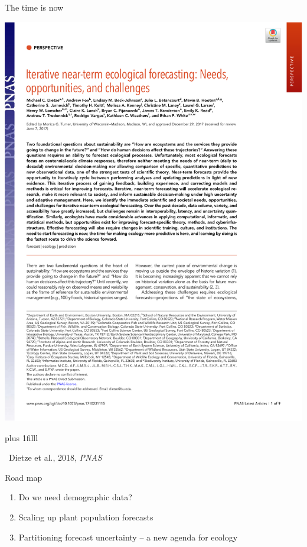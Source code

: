 \documentclass[14pt, compress, aspectratio=1610]{beamer}
\newcommand{\btVFill}{\vskip0pt plus 1filll}
\newcommand{\credit}[1]{\btVFill\par\hfill \footnotesize ~#1}
\providecommand{\tightlist}{%
  \setlength{\itemsep}{0pt}\setlength{\parskip}{0pt}}
\begin{document}
\begin{frame}{%
\protect\hypertarget{the-time-is-now}{%
The time is now}}

\includegraphics[width=\textwidth]{./figures/dietze_title.pdf}

\credit{Dietze et al., 2018, \emph{PNAS}}

\end{frame}

\begin{frame}{%
\protect\hypertarget{road-map}{%
Road map}}

\begin{enumerate}
[1.]
\tightlist
\item
  Do we need demographic data?
\item
  Scaling up plant population forecasts
\item
  Partitioning forecast uncertainty – a new agenda for ecology
\end{enumerate}

\end{frame}
\end{document}
